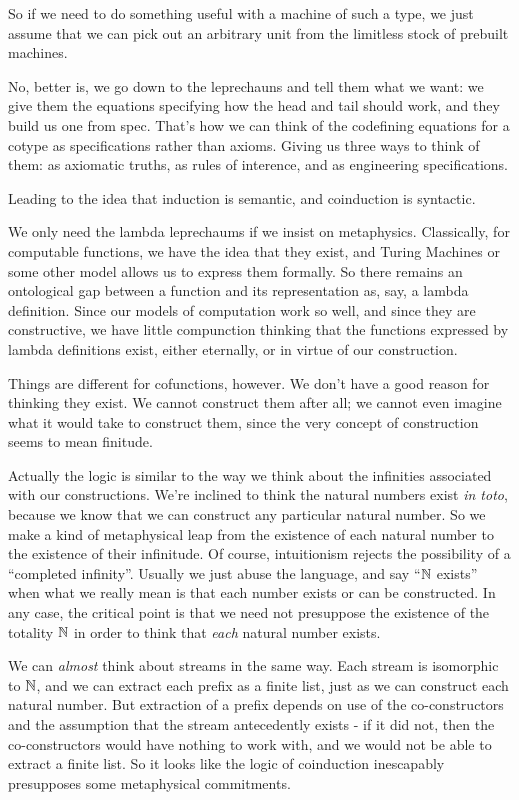 \documentclass{article}
\begin{document}
So if we need to do something useful with a machine of such a type, we
just assume that we can pick out an arbitrary unit from the limitless
stock of prebuilt machines.

No, better is, we go down to the leprechauns and tell them what we
want: we give them the equations specifying how the head and tail
should work, and they build us one from spec. That's how we can think
of the codefining equations for a cotype as specifications rather than
axioms. Giving us three ways to think of them: as axiomatic truths, as
rules of interence, and as engineering specifications.

Leading to the idea that induction is semantic, and coinduction is
syntactic.

We only need the lambda leprechaums if we insist on metaphysics.
Classically, for computable functions, we have the idea that they
exist, and Turing Machines or some other model allows us to express
them formally. So there remains an ontological gap between a function
and its representation as, say, a lambda definition. Since our models
of computation work so well, and since they are constructive, we have
little compunction thinking that the functions expressed by lambda
definitions exist, either eternally, or in virtue of our construction.

Things are different for cofunctions, however. We don't have a good
reason for thinking they exist. We cannot construct them after all; we
cannot even imagine what it would take to construct them, since the
very concept of construction seems to mean finitude.

Actually the logic is similar to the way we think about the infinities
associated with our constructions. We're inclined to think the natural
numbers exist \textit{in toto}, because we know that we can construct
any particular natural number. So we make a kind of metaphysical leap
from the existence of each natural number to the existence of their
infinitude. Of course, intuitionism rejects the possibility of a
``completed infinity''. Usually we just abuse the language, and say
``\(\mathbb{N}\) exists'' when what we really mean is that each number
exists or can be constructed. In any case, the critical point is that
we need not presuppose the existence of the totality \(\mathbb{N}\) in order
to think that \textit{each} natural number exists.

We can \textit{almost} think about streams in the same way. Each
stream is isomorphic to \(\mathbb{N}\), and we can extract each prefix as a
finite list, just as we can construct each natural number. But
extraction of a prefix depends on use of the co-constructors and the
assumption that the stream antecedently exists - if it did not, then
the co-constructors would have nothing to work with, and we would not
be able to extract a finite list. So it looks like the logic of
coinduction inescapably presupposes some metaphysical commitments.
\end{document}
